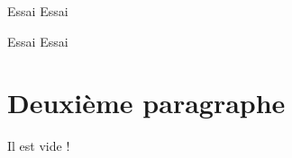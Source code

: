 \documentclass[12pt,french,oneside]{book}
\begin{document}
\begin{spacing}{1.2}
\begin{CadreColor}
\dotfill
\end{CadreColor}

\medskip

\begin{CadreAlgo}{0.5\linewidth}{Essai}
Essai
\end{CadreAlgo}

\begin{CadreModule}{Essai}
Essai
\end{CadreModule}


\section{Deuxième paragraphe}

Il est vide !

\end{spacing}
\end{document}
